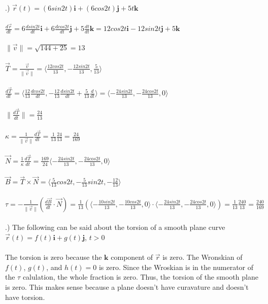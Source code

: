 \documentclass[12pt]{article}
\begin{document}
.) $\vec{r}(t) = (6sin{2t})\mathbf{i} + (6cos{2t})\mathbf{j} + 5t\mathbf{k}$\\\\
\noindent $\frac{d\vec{r}}{dt} = 6\frac{dsin{2t}}{dt}\mathbf{i} + 6\frac{dcos{2t}}{dt}\mathbf{j} + 5\frac{dt}{dt}\mathbf{k} =
12cos{2t}\mathbf{i} - 12sin{2t}\mathbf{j} + 5\mathbf{k}$\\\\
\noindent $\| \vec{v} \| = \sqrt{144 + 25} = 13 $\\\\
\noindent $\vec{T} = \frac{\vec{v}}{\| \vec{v} \|} = \langle \frac{12cos{2t}}{13}, -\frac{12sin{2t}}{13}, \frac{5}{13}\rangle$\\\\
\noindent $\frac{d\vec{T}}{dt} = \langle \frac{12}{13}\frac{dcos{2t}}{dt} , -\frac{12}{13}\frac{dsin{2t}}{dt} + \frac{5}{13}\frac{d}{dt}\rangle
= \langle -\frac{24sin{2t}}{13}, -\frac{24cos{2t}}{13}, 0 \rangle$\\\\
\noindent $\| \frac{d\vec{T}}{dt} \|  = \frac{24}{13}$\\\\
\noindent $\kappa = \frac{1}{\| \vec{v} \| }\frac{d\vec{T}}{dt} = \frac{1}{13}\frac{24}{13} =\frac{24}{169}$\\\\
\noindent $\vec{N} = \frac{1}{\kappa}\frac{d\vec{T}}{dt} = \frac{169}{24}\langle -\frac{24sin{2t}}{13}, -\frac{24cos{2t}}{13}, 0\rangle $\\\\
\noindent $\vec{B} = \vec{T} \times \vec{N} = \langle \frac{5}{13}cos{2t}, -\frac{5}{13}sin{2t}, -\frac{12}{13}\rangle$\\\\
\noindent $\tau = -\frac{1}{\| \vec{v} \| }(\frac{d\vec{B}}{dt}\cdot \vec{N}) = \frac{1}{13}(\langle -\frac{10sin{2t}}{13}, -\frac{10cos{2t}}{13}, 0\rangle \cdot \langle -\frac{24sin{2t}}{13}, -\frac{24cos{2t}}{13}, 0\rangle) = \frac{1}{13}\frac{240}{13} = \frac{240}{169}$\\\\
.) The following can be said about the torsion of a smooth plane curve $\vec{r}(t) = f(t)\mathbf{i} + g(t)\mathbf{j}$, \hspace{10pt} $t > 0$\\\\
\noindent The torsion is zero because the $\mathbf{k}$ component of $\vec{r}$ is zero. The Wronskian of $f(t)$, $g(t)$, and $h(t) = 0$ is zero. Since the Wroskian is in the numerator of the $\tau$ calulation, the whole fraction is zero. Thus, the torsion of the smooth plane is zero. This makes sense because a plane doesn't have curavature and doesn't have torsion.\\\\
\end{document}

